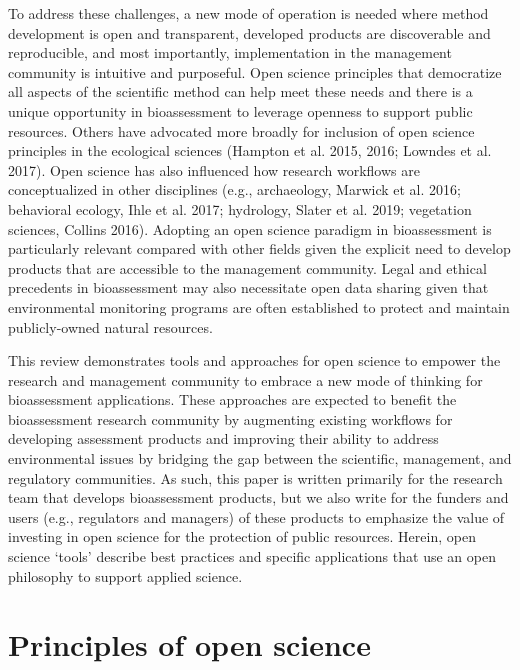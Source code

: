 \documentclass[fleqn,10pt,lineno]{wlpeerj} %
\begin{document}
To address these challenges, a new mode of operation is needed where method development is open and transparent, developed products are discoverable and reproducible, and most importantly, implementation in the management community is intuitive and purposeful. Open science principles that democratize all aspects of the scientific method can help meet these needs and there is a unique opportunity in bioassessment to leverage openness to support public resources. Others have advocated more broadly for inclusion of open science principles in the ecological sciences (Hampton et al. 2015, 2016; Lowndes et al. 2017). Open science has also influenced how research workflows are conceptualized in other disciplines (e.g., archaeology, Marwick et al. 2016; behavioral ecology, Ihle et al. 2017; hydrology, Slater et al. 2019; vegetation sciences, Collins 2016). Adopting an open science paradigm in bioassessment is particularly relevant compared with other fields given the explicit need to develop products that are accessible to the management community. Legal and ethical precedents in bioassessment may also necessitate open data sharing given that environmental monitoring programs are often established to protect and maintain publicly-owned natural resources.

This review demonstrates tools and approaches for open science to empower the research and management community to embrace a new mode of thinking for bioassessment applications. These approaches are expected to benefit the bioassessment research community by augmenting existing workflows for developing assessment products and improving their ability to address environmental issues by bridging the gap between the scientific, management, and regulatory communities. As such, this paper is written primarily for the research team that develops bioassessment products, but we also write for the funders and users (e.g., regulators and managers) of these products to emphasize the value of investing in open science for the protection of public resources. Herein, open science `tools' describe best practices and specific applications that use an open philosophy to support applied science.

\hypertarget{principles-of-open-science}{%
\section{Principles of open science}\label{principles-of-open-science}}
\end{document}
